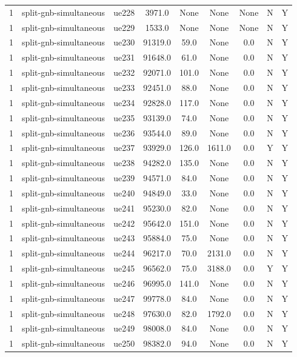 \begin{table}[ht]
\begin{tabular}{|c|c|c|c|c|c|c|c|c|}
1 & split-gnb-simultaneous & ue228 & 3971.0 & None & None & None & N & Y \\
1 & split-gnb-simultaneous & ue229 & 1533.0 & None & None & None & N & Y \\
1 & split-gnb-simultaneous & ue230 & 91319.0 & 59.0 & None & 0.0 & N & Y \\
1 & split-gnb-simultaneous & ue231 & 91648.0 & 61.0 & None & 0.0 & N & Y \\
1 & split-gnb-simultaneous & ue232 & 92071.0 & 101.0 & None & 0.0 & N & Y \\
1 & split-gnb-simultaneous & ue233 & 92451.0 & 88.0 & None & 0.0 & N & Y \\
1 & split-gnb-simultaneous & ue234 & 92828.0 & 117.0 & None & 0.0 & N & Y \\
1 & split-gnb-simultaneous & ue235 & 93139.0 & 74.0 & None & 0.0 & N & Y \\
1 & split-gnb-simultaneous & ue236 & 93544.0 & 89.0 & None & 0.0 & N & Y \\
1 & split-gnb-simultaneous & ue237 & 93929.0 & 126.0 & 1611.0 & 0.0 & Y & Y \\
1 & split-gnb-simultaneous & ue238 & 94282.0 & 135.0 & None & 0.0 & N & Y \\
1 & split-gnb-simultaneous & ue239 & 94571.0 & 84.0 & None & 0.0 & N & Y \\
1 & split-gnb-simultaneous & ue240 & 94849.0 & 33.0 & None & 0.0 & N & Y \\
1 & split-gnb-simultaneous & ue241 & 95230.0 & 82.0 & None & 0.0 & N & Y \\
1 & split-gnb-simultaneous & ue242 & 95642.0 & 151.0 & None & 0.0 & N & Y \\
1 & split-gnb-simultaneous & ue243 & 95884.0 & 75.0 & None & 0.0 & N & Y \\
1 & split-gnb-simultaneous & ue244 & 96217.0 & 70.0 & 2131.0 & 0.0 & N & Y \\
1 & split-gnb-simultaneous & ue245 & 96562.0 & 75.0 & 3188.0 & 0.0 & Y & Y \\
1 & split-gnb-simultaneous & ue246 & 96995.0 & 141.0 & None & 0.0 & N & Y \\
1 & split-gnb-simultaneous & ue247 & 99778.0 & 84.0 & None & 0.0 & N & Y \\
1 & split-gnb-simultaneous & ue248 & 97630.0 & 82.0 & 1792.0 & 0.0 & N & Y \\
1 & split-gnb-simultaneous & ue249 & 98008.0 & 84.0 & None & 0.0 & N & Y \\
1 & split-gnb-simultaneous & ue250 & 98382.0 & 94.0 & None & 0.0 & N & Y \\

\end{tabular}
\end{table}

